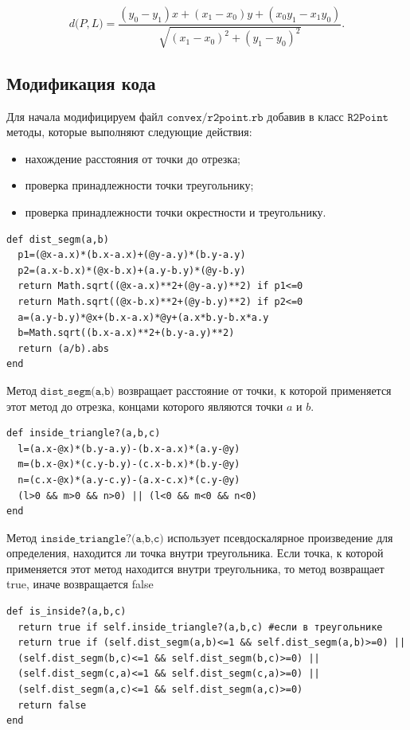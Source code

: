 $$d\bigr(P,L)=\frac{(y_{0}-y_{1})x+(x_{1}-x_{0})y+(x_{0}y_{1}-x_{1}y_{0})}{\sqrt{(x_{1}-x_{0})^2+(y_{1}-y_{0})^2}}.$$

 
\subsection*{Модификация кода}
Для начала модифицируем файл $\texttt{convex/r2point.rb}$ добавив в класс $\texttt{R2Point}$ методы,
которые выполняют следующие действия:

\medskip
\begin{itemize}
\item нахождение расстояния от точки до отрезка;
\item проверка принадлежности точки треугольнику;
\item проверка принадлежности точки окрестности и треугольнику.
\end{itemize}

\begin{small}
\begin{verbatim}
def dist_segm(a,b)
  p1=(@x-a.x)*(b.x-a.x)+(@y-a.y)*(b.y-a.y) 
  p2=(a.x-b.x)*(@x-b.x)+(a.y-b.y)*(@y-b.y)
  return Math.sqrt((@x-a.x)**2+(@y-a.y)**2) if p1<=0 
  return Math.sqrt((@x-b.x)**2+(@y-b.y)**2) if p2<=0 
  a=(a.y-b.y)*@x+(b.x-a.x)*@y+(a.x*b.y-b.x*a.y
  b=Math.sqrt((b.x-a.x)**2+(b.y-a.y)**2)
  return (a/b).abs 
end
\end{verbatim}
\end{small}   

Метод $\texttt{dist\_segm(a,b)}$ возвращает расстояние от точки, к которой применяется этот метод до отрезка, концами которого являются точки $\mathit a$ и $\mathit b$.

\begin{small}
\begin{verbatim}
def inside_triangle?(a,b,c)
  l=(a.x-@x)*(b.y-a.y)-(b.x-a.x)*(a.y-@y)
  m=(b.x-@x)*(c.y-b.y)-(c.x-b.x)*(b.y-@y)
  n=(c.x-@x)*(a.y-c.y)-(a.x-c.x)*(c.y-@y)
  (l>0 && m>0 && n>0) || (l<0 && m<0 && n<0)
end
\end{verbatim}
\end{small} 

Метод $\texttt{inside\_triangle?(a,b,c)}$ использует псевдоскалярное произведение для определения, находится ли точка внутри треугольника. Если точка, к которой применяется этот метод находится внутри треугольника, то метод возвращает true, иначе возвращается false

\begin{small}
\begin{verbatim}
def is_inside?(a,b,c)
  return true if self.inside_triangle?(a,b,c) #если в треугольнике
  return true if (self.dist_segm(a,b)<=1 && self.dist_segm(a,b)>=0) ||
  (self.dist_segm(b,c)<=1 && self.dist_segm(b,c)>=0) ||
  (self.dist_segm(c,a)<=1 && self.dist_segm(c,a)>=0) || 
  (self.dist_segm(a,c)<=1 && self.dist_segm(a,c)>=0)
  return false
end
\end{verbatim}
\end{small} 

